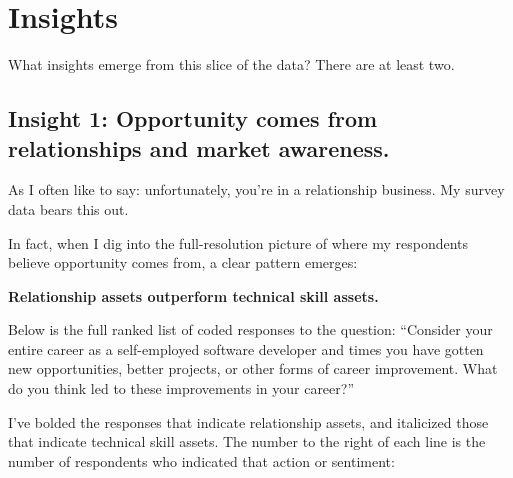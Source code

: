 \documentclass[13pt,]{tufte-handout}
\begin{document}
\hypertarget{insights}{%
\section{Insights}\label{insights}}

What insights emerge from this slice of the data? There are at least
two.

\hypertarget{insight-1-opportunity-comes-from-relationships-and-market-awareness.}{%
\subsection{Insight 1: Opportunity comes from relationships and market
awareness.}\label{insight-1-opportunity-comes-from-relationships-and-market-awareness.}}

As I often like to say: unfortunately, you're in a relationship
business. My survey data bears this out.

In fact, when I dig into the full-resolution picture of where my
respondents believe opportunity comes from, a clear pattern emerges:

\textbf{Relationship assets outperform technical skill assets.}

Below is the full ranked list of coded responses to the question:
``Consider your entire career as a self-employed software developer and
times you have gotten new opportunities, better projects, or other forms
of career improvement. What do you think led to these improvements in
your career?''

I've bolded the responses that indicate relationship assets, and
italicized those that indicate technical skill assets. The number to the
right of each line is the number of respondents who indicated that
action or sentiment:
\end{document}
